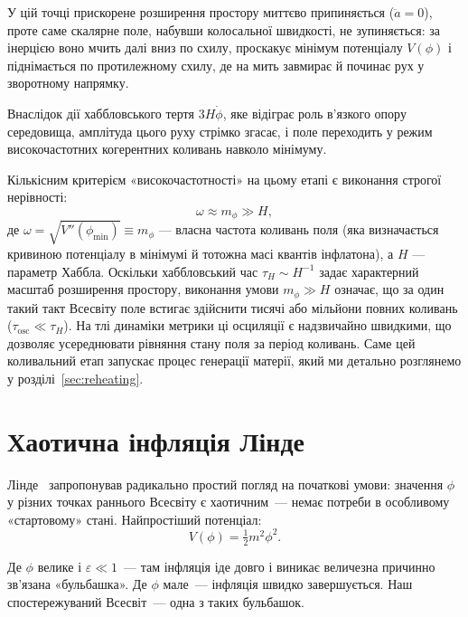 У цій точці прискорене розширення простору миттєво припиняється ($\ddot{a}=0$), проте саме скалярне поле, набувши колосальної швидкості, не зупиняється: за інерцією воно мчить далі вниз по схилу, проскакує мінімум потенціалу $V(\phi)$ і піднімається по протилежному схилу, де на мить завмирає й починає рух у зворотному напрямку.

Внаслідок дії хаббловського тертя $3H\dot{\phi}$, яке відіграє роль в'язкого опору середовища, амплітуда цього руху стрімко згасає, і поле переходить у режим високочастотних когерентних коливань навколо мінімуму.

Кількісним критерієм «високочастотності» на цьому етапі є виконання строгої нерівності:
\begin{equation*}
    \omega \approx m_\phi \gg H,
\end{equation*}
де $\omega = \sqrt{V''(\phi_{\mathrm{min}})} \equiv m_\phi$ --- власна частота коливань поля (яка визначається кривиною потенціалу в мінімумі й тотожна масі квантів інфлатона), а $H$ --- параметр Хаббла. Оскільки хаббловський час $\tau_H \sim H^{-1}$ задає характерний масштаб розширення простору, виконання умови $m_\phi \gg H$ означає, що за один такий такт Всесвіту поле встигає здійснити тисячі або мільйони повних коливань ($\tau_{\mathrm{osc}} \ll \tau_H$). На тлі динаміки метрики ці осциляції є надзвичайно швидкими, що дозволяє усереднювати рівняння стану поля за період коливань. Саме цей коливальний етап запускає процес генерації матерії, який ми детально розглянемо у розділі~\ref{sec:reheating}.



\section{Хаотична інфляція Лінде}
\label{sec:chaotic}

Лінде~\cite{linde_1983} запропонував радикально простий погляд
на початкові умови: значення $\phi$ у різних точках раннього
Всесвіту є хаотичним~--- немає потреби в особливому «стартовому»
стані. Найпростіший потенціал:
\begin{equation*}
  V(\phi) = \tfrac{1}{2}m^2\phi^2.
\end{equation*}

Де $\phi$ велике і $\varepsilon \ll 1$~--- там інфляція іде довго
і виникає величезна причинно зв'язана «бульбашка». Де $\phi$ мале~---
інфляція швидко завершується. Наш спостережуваний Всесвіт~---
одна з таких бульбашок.

